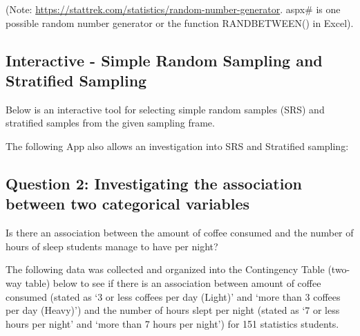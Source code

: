 \documentclass[
]{book}
\begin{document}
(Note: \url{https://stattrek.com/statistics/random-number-generator}.
aspx\# is one possible random number generator or the function RANDBETWEEN()
in Excel).

\subsection{Interactive - Simple Random Sampling and Stratified Sampling}\label{interactive---simple-random-sampling-and-stratified-sampling}

Below is an interactive tool for selecting simple random samples (SRS) and stratified samples from the given sampling frame.

The following App also allows an investigation into SRS and Stratified sampling:

\subsection{Question 2: Investigating the association between two categorical variables}\label{question-2-investigating-the-association-between-two-categorical-variables}

Is there an association between the amount of coffee consumed and the number of hours of sleep students manage to have per night?

The following data was collected and organized into the Contingency Table (two-way table) below to see if there is an association between amount of coffee consumed
(stated as `3 or less coffees per day (Light)' and `more than 3 coffees per day (Heavy)') and the number of hours slept per night (stated as `7 or less hours per night' and `more than 7 hours per night') for 151 statistics students.
\end{document}
